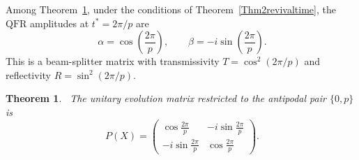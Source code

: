 \documentclass[12pt]{amsart}
\newtheorem{theorem}{Theorem}[section]
\newcommand{\QFR}{\mathrm{QFR}}
\begin{document}
Among Theorem~\ref{Thm3revivaltime}, under the conditions of Theorem~\ref{Thm2revivaltime}, the $\QFR$ amplitudes at $t^* = 2\pi/p$
  are
\begin{equation}~\label{eqq1Thm3revivaltime}
\alpha = \cos\!\left(\frac{2\pi}{p}\right), \qquad \beta = -i\sin\!\left(\frac{2\pi}{p}\right).
\end{equation}
  This is a beam-splitter matrix with transmissivity $T = \cos^2(2\pi/p)$ and reflectivity
  $R = \sin^2(2\pi/p)$.
\begin{theorem}~\label{Thm3revivaltime}
  The unitary evolution matrix restricted to the antipodal pair $\{0, p\}$ is
  \begin{equation}~\label{eqq2Thm3revivaltime}
    P(X)= \begin{pmatrix} \cos\!\tfrac{2\pi}{p} & -i\sin\!\tfrac{2\pi}{p} \\[4pt]
                        -i\sin\!\tfrac{2\pi}{p} & \cos\!\tfrac{2\pi}{p} \end{pmatrix}.
  \end{equation}
\end{theorem}
\end{document}

